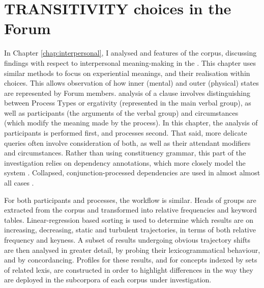 
\chapter{TRANSITIVITY choices in the Forum} \label{chap:experiential}

In Chapter \ref{chap:interpersonal}, I analysed  and  features of the \gls{corpus}, discussing findings with respect to interpersonal meaning\hyp{}making in the . This chapter uses similar methods to focus on experiential meanings, and their realisation within  choices. This allows observation of how inner (mental) and outer (physical) states are represented by \gls{Forum} \glspl{member}.  analysis of a clause involves distinguishing between Process Types or ergativity (represented in the main verbal group), as well as participants (the arguments of the verbal group) and circumstances (which modify the meaning made by the process). In this chapter, the analysis of participants is performed first, and processes second. That said, more delicate queries often involve consideration of both, as well as their attendant modifiers and circumstances. Rather than using constituency grammar, this part of the investigation relies on dependency annotations, which more closely model the  system \cite{costetchi_method_2013}. Collapsed, conjunction\hyp{}processed dependencies are used in almost almost all cases \cite[see][]{manning_stanford_2014}.

For both participants and processes, the workflow is similar. Heads of groups are extracted from the \gls{corpus} and transformed into relative frequencies and keyword tables. Linear\hyp{}regression based sorting is used to determine which results are on increasing, decreasing, static and turbulent trajectories, in terms of both relative frequency and keyness. A subset of results undergoing obvious trajectory shifts are then analysed in greater detail, by probing their lexicogrammatical behaviour, and by concordancing. Profiles for these results, and for concepts indexed by sets of related lexis, are constructed in order to highlight differences in the way they are deployed in the subcorpora of each \gls{corpus} under investigation.

